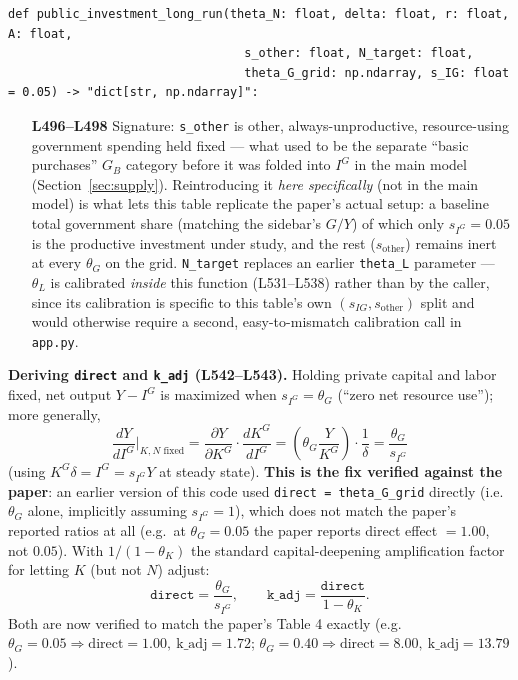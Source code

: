 \documentclass[11pt]{article}
\newcommand{\eq}[1]{\begin{equation}#1\end{equation}}
\begin{document}
\begin{lstlisting}[firstnumber=496]
def public_investment_long_run(theta_N: float, delta: float, r: float, A: float,
                                 s_other: float, N_target: float,
                                 theta_G_grid: np.ndarray, s_IG: float = 0.05) -> "dict[str, np.ndarray]":
\end{lstlisting}
\begin{itemize}
\item[\textbf{L496--L498}] Signature: \texttt{s\_other} is other,
always-unproductive, resource-using government spending held fixed ---
what used to be the separate ``basic purchases'' $G_B$ category before it
was folded into $I^G$ in the main model (Section~\ref{sec:supply}).
Reintroducing it \emph{here specifically} (not in the main model) is what
lets this table replicate the paper's actual setup: a baseline total
government share (matching the sidebar's $G/Y$) of which only $s_{I^G}=0.05$
is the productive investment under study, and the rest ($s_{\text{other}}$)
remains inert at every $\theta_G$ on the grid. \texttt{N\_target} replaces
an earlier \texttt{theta\_L} parameter --- $\theta_L$ is calibrated
\emph{inside} this function (L531--L538) rather than by the caller, since
its calibration is specific to this table's own $(s_{IG},s_{\text{other}})$
split and would otherwise require a second, easy-to-mismatch calibration
call in \texttt{app.py}.
\end{itemize}

\textbf{Deriving \texttt{direct} and \texttt{k\_adj} (L542--L543).} Holding
private capital and labor fixed, net output $Y-I^G$ is maximized when
$s_{I^G}=\theta_G$ (``zero net resource use''); more generally,
\eq{ \frac{dY}{dI^G}\bigg|_{K,N\text{ fixed}} = \frac{\partial Y}{\partial K^G}\cdot\frac{dK^G}{dI^G}
   = \left(\theta_G\frac{Y}{K^G}\right)\cdot\frac{1}{\delta} = \frac{\theta_G}{s_{I^G}} }
(using $K^G\delta=I^G=s_{I^G}Y$ at steady state). \textbf{This is the fix
verified against the paper}: an earlier version of this code used
\texttt{direct = theta\_G\_grid} directly (i.e.\ $\theta_G$ alone, implicitly
assuming $s_{I^G}=1$), which does not match the paper's reported ratios at
all (e.g.\ at $\theta_G=0.05$ the paper reports direct effect $=1.00$, not
$0.05$). With $1/(1-\theta_K)$ the standard capital-deepening amplification
factor for letting $K$ (but not $N$) adjust:
\eq{ \texttt{direct} = \frac{\theta_G}{s_{I^G}}, \qquad \texttt{k\_adj} = \frac{\texttt{direct}}{1-\theta_K}. }
Both are now verified to match the paper's Table 4 exactly (e.g.\
$\theta_G=0.05\Rightarrow\text{direct}=1.00,\ \text{k\_adj}=1.72$;
$\theta_G=0.40\Rightarrow\text{direct}=8.00,\ \text{k\_adj}=13.79$).
\end{document}
